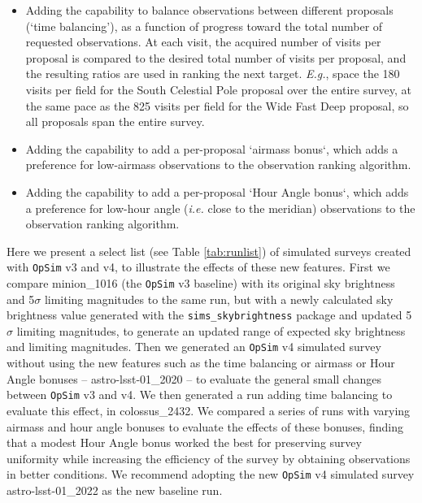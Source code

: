 \documentclass[DM,authoryear,toc]{lsstdoc}
\newcommand{\opsim}{\texttt{OpSim}\xspace}
\newcommand{\simsky}{\texttt{sims\_skybrightness}\xspace}
\begin{document}
\begin{itemize}
\item Adding the capability to balance observations between different proposals (`time balancing'), as a function of progress toward the total number of requested observations. At each visit, the acquired number of visits per proposal is compared to the desired total number of visits per proposal, and the resulting ratios are used in ranking the next target.  {\it E.g.}, space the 180 visits per field for the South Celestial Pole proposal over the entire survey, at the same pace as the 825 visits per field for the Wide Fast Deep proposal, so all proposals span the entire survey.
\item Adding the capability to add a per-proposal `airmass bonus`, which adds a preference for low-airmass observations to the observation ranking algorithm.
\item Adding the capability to add a per-proposal `Hour Angle bonus`, which adds a preference for low-hour angle ({\it i.e.} close to the meridian) observations to the observation ranking algorithm.
\end{itemize}

Here we present a select list (see Table \ref{tab:runlist}) of simulated surveys created with \opsim v3 and v4, to illustrate the effects of these new features. First we compare minion\_1016 (the \opsim v3 baseline) with its original sky brightness and 5$\sigma$ limiting magnitudes to the same run, but with a newly calculated sky brightness value generated with the \simsky package and updated 5$\sigma$ limiting magnitudes, to generate an updated range of expected sky brightness and limiting magnitudes. Then we generated an \opsim v4 simulated survey without using the new features such as the time balancing or airmass or Hour Angle bonuses -- astro-lsst-01\_2020 -- to evaluate the general small changes between \opsim v3 and v4. We then generated a run adding time balancing to evaluate this effect, in colossus\_2432.  We compared a series of runs with varying airmass and hour angle bonuses to evaluate the effects of these bonuses, finding that a modest Hour Angle bonus worked the best for preserving survey uniformity while increasing the efficiency of the survey by obtaining observations in better conditions. We recommend adopting the new \opsim v4 simulated survey astro-lsst-01\_2022 as the new baseline run.
\end{document}
